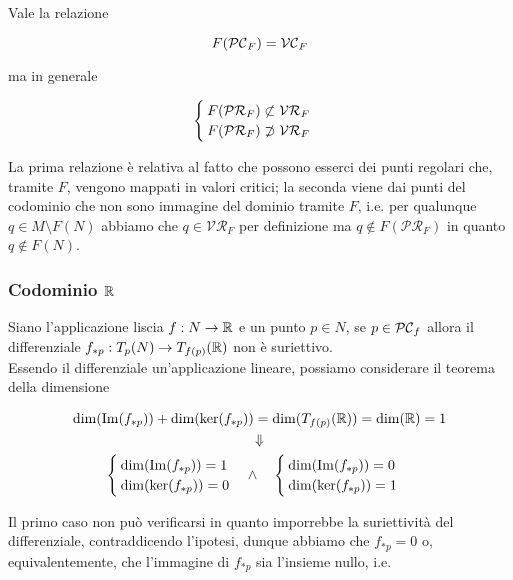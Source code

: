 \begin{remark}
	Vale la relazione
	
	\begin{equation}
		F(\mathcal{PC}_{F}) = \mathcal{VC}_{F}
	\end{equation}

	ma in generale
	
	\begin{equation}
		\begin{cases}
			F(\mathcal{PR}_{F}) \not\subset \mathcal{VR}_{F}\\
			F(\mathcal{PR}_{F}) \not\supset \mathcal{VR}_{F}
		\end{cases}
	\end{equation}

	La prima relazione è relativa al fatto che possono esserci dei punti regolari che, tramite $ F $, vengono mappati in valori critici; la seconda viene dai punti del codominio che non sono immagine del dominio tramite $ F $, i.e. per qualunque $ q \in M \setminus F(N) $ abbiamo che $ q \in \mathcal{VR}_{F} $ per definizione ma $ q \notin F(\mathcal{PR}_{F}) $ in quanto $ q \notin F(N) $.
\end{remark}

\subsubsection{Codominio $ \mathbb{R} $}

Siano l'applicazione liscia $ f : N \to \mathbb{R} $ e un punto $ p \in N $, se $ p \in \mathcal{PC}_{f} $ allora il differenziale $ f_{*p} : T_{p}(N) \to T_{f(p)}(\mathbb{R}) $ non è suriettivo.\\
Essendo il differenziale un'applicazione lineare, possiamo considerare il teorema della dimensione

\begin{gather}
	\dim(\Im(f_{*p})) + \dim(\ker(f_{*p})) = \dim(T_{f(p)}(\R)) = \dim(\R) = 1 \\%
	\Downarrow \nonumber \\%
	\begin{cases}
		\dim(\Im(f_{*p})) = 1\\
		\dim(\ker(f_{*p})) = 0
	\end{cases} %
	\wedge \quad
	\begin{cases}
		\dim(\Im(f_{*p})) = 0\\
		\dim(\ker(f_{*p})) = 1
	\end{cases}
\end{gather}

Il primo caso non può verificarsi in quanto imporrebbe la suriettività del differenziale, contraddicendo l'ipotesi, dunque abbiamo che $ f_{*p} = 0 $ o, equivalentemente, che l'immagine di $ f_{*p} $ sia l'insieme nullo, i.e.

